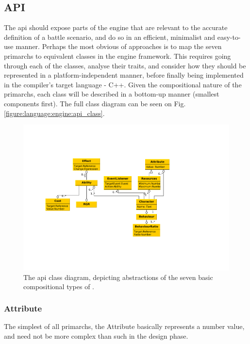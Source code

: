 \subsection*{API}

The \ac{api} should expose parts of the engine that are relevant to the accurate definition of a battle scenario, and do so in an efficient, minimalist and easy-to-use manner. Perhaps the most obvious of approaches is to map the seven \langname{} primarchs to equivalent classes in the engine framework. This requires going through each of the classes, analyse their traits, and consider how they should be represented in a platform-independent manner, before finally being implemented in the compiler's target language - C++. Given the compositional nature of the primarchs, each class will be described in a bottom-up manner (smallest components first). The full class diagram can be seen on Fig. \vref{figure:language:engine:api_class}.

\begin{figure}
\centering
\includegraphics[scale=.6, clip=true, trim=1cm 4cm 1cm 4cm]{img/class_diagram_api}
\caption{\label{figure:language:engine:api_class}The \ac{api} class diagram, depicting abstractions of the seven basic compositional types of \langname{}.}
\end{figure}

\subsubsection*{Attribute}
The simplest of all primarchs, the Attribute basically represents a number value, and need not be more complex than such in the design phase.

